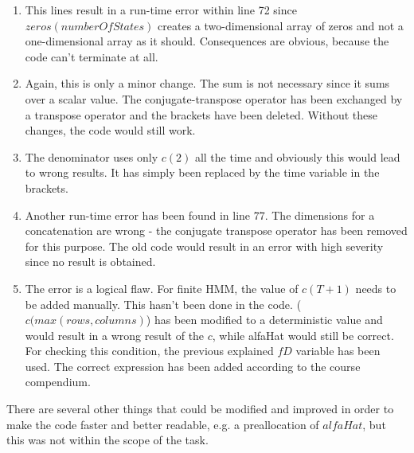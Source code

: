 \begin{enumerate}
\item This lines result in a run-time error within line 72 since $zeros(numberOfStates)$ creates a two-dimensional array of zeros and not a one-dimensional array as it should. Consequences are obvious, because the code can't terminate at all.
\item Again, this is only a minor change. The sum is not necessary since it sums over a scalar value. The conjugate-transpose operator has been exchanged by a transpose operator and the brackets have been deleted. Without these changes, the code would still work.
\item The denominator uses only $c(2)$ all the time and obviously this would lead to wrong results. It has simply been replaced by the time variable in the brackets.
\item Another run-time error has been found in line 77. The dimensions for a concatenation are wrong - the conjugate transpose operator has been removed for this purpose. The old code would result in an error with high severity since no result is obtained.
\item The error is a logical flaw. For finite HMM, the value of $c(T+1)$ needs to be added manually. This hasn't been done in the code. ($c(max(rows,columns)$) has been modified to a deterministic value and would result in a wrong result of the $c$, while alfaHat would still be correct. For checking this condition, the previous explained $fD$ variable has been used. The correct expression has been added according to the course compendium.
\end{enumerate}
There are several other things that could be modified and improved in order to make the code faster and better readable, e.g. a preallocation of $alfaHat$, but this was not within the scope of the task.
\\
